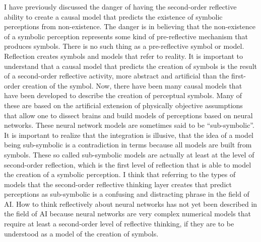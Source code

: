 I have previously discussed the danger of having the second-order
reflective ability to create a causal model that predicts the
existence of symbolic perceptions from non-existence.  The danger is
in believing that the non-existence of a symbolic perception
represents some kind of pre-reflective mechanism that produces
symbols.  There is no such thing as a pre-reflective symbol or model.
Reflection creates symbols and models that refer to reality.  It is
important to understand that a causal model that predicts the creation
of symbols is the result of a second-order reflective activity, more
abstract and artificial than the first-order creation of the symbol.
Now, there have been many causal models that have been developed to
describe the creation of perceptual symbols.  Many of these are based
on the artificial extension of physically objective assumptions that
allow one to dissect brains and build models of perceptions based on
neural networks.  These neural network models are sometimes said to be
``sub-symbolic''.  It is important to realize that the integration is
illusive, that the idea of a model being sub-symbolic is a
contradiction in terms because all models are built from symbols.
These so called sub-symbolic models are actually at least at the level
of second-order reflection, which is the first level of reflection
that is able to model the creation of a symbolic perception.  I think
that referring to the types of models that the second-order reflective
thinking layer creates that predict perceptions as sub-symbolic is a
confusing and distracting phrase in the field of AI.  How to think
reflectively about neural networks has not yet been described in the
field of AI because neural networks are very complex numerical models
that require at least a second-order level of reflective thinking, if
they are to be understood as a model of the creation of symbols.

